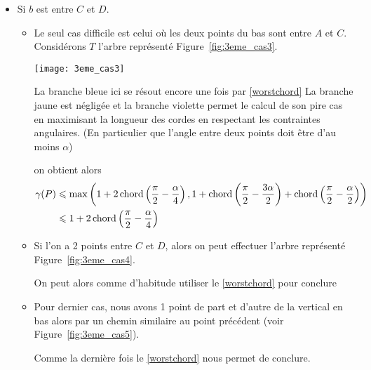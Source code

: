 \begin{itemize}
\begin{itemize}
\end{itemize}

\item \label{3cas2} Si $b$ est entre $C$ et $D$.

\begin{itemize}

\item \label{3cas21} Le seul cas difficile est celui où les deux points du bas sont entre $A$ et $C$.
Considérons $T$ l'arbre représenté Figure~\ref{fig:3eme_cas3}.

 \texttt{[image: 3eme\_cas3]}\label{fig:3eme_cas3}

La branche bleue ici se résout encore une fois par \ref{worstchord}
La branche jaune est négligée
et la branche violette permet le calcul de son pire cas en maximisant la longueur des cordes en respectant les contraintes angulaires. (En particulier que l'angle entre deux points doit être d'au moins $\alpha$)

on obtient alors
\begin{align*}
\gamma(P) &\leqslant \max\left(1+2\operatorname{chord}\left(\frac{\pi}{2} - \frac{\alpha}{4}\right), 1 + \operatorname{chord}\left(\frac{\pi}{2} - \frac{3\alpha}{2}\right) + \operatorname{chord}\left(\frac{\pi}{2} - \frac{\alpha}{2}\right)\right) \\
&\leqslant 1+2\operatorname{chord}\left(\frac{\pi}{2} - \frac{\alpha}{4}\right)
\end{align*}

\item \label{3cas22} Si l'on a 2 points entre $C$ et $D$, alors on peut
  effectuer l'arbre représenté Figure~\ref{fig:3eme_cas4}.

On peut alors comme d'habitude utiliser le \cref{worstchord} pour conclure

\item \label{3cas23} Pour dernier cas, nous avons 1 point de part et d'autre de
  la vertical en bas alors par un chemin similaire au point précédent (voir
    Figure~\ref{fig:3eme_cas5}).


Comme la dernière fois le \cref{worstchord} nous permet de conclure.

\end{itemize}
\end{itemize}

